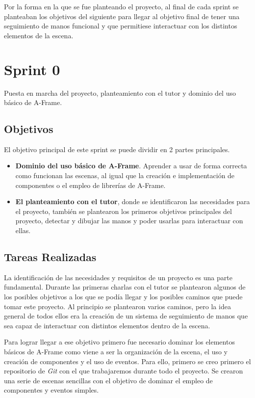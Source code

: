 \documentclass[a4paper, 12pt]{book}
\begin{document}
Por la forma en la que se fue planteando el proyecto, al final de cada sprint se planteaban los objetivos del siguiente para llegar al objetivo final de tener una seguimiento de manos funcional y que permitiese interactuar con los distintos elementos de la escena. \section{Sprint 0}
\label{sec:sprint0}
Puesta en marcha del proyecto, planteamiento con el tutor y dominio del uso básico de A-Frame.
\subsection{Objetivos}
\label{subsec:objetivo-principal0}
El objetivo principal de este sprint se puede dividir en 2 partes principales. 
\begin{itemize}
  \item \textbf{Dominio del uso básico de A-Frame}. Aprender a usar de forma correcta como funcionan las escenas, al igual que la creación e implementación de componentes o el empleo de librerías de A-Frame.
  \item \textbf{El planteamiento con el tutor}, donde se identificaron las necesidades para el proyecto, también se plantearon los primeros objetivos principales del proyecto, detectar y dibujar las manos y poder usarlas para interactuar con ellas. 
\end{itemize}

\subsection{Tareas Realizadas}
\label{subsec:implementacion0}
La identificación de las necesidades y requisitos de un proyecto es una parte fundamental. Durante las primeras charlas con el tutor se plantearon algunos de los posibles objetivos a los que se podía llegar y los posibles caminos que puede tomar este proyecto. 
Al principio se plantearon varios caminos, pero la idea general de todos ellos era la creación de un sistema de seguimiento de manos que sea capaz de interactuar con distintos elementos dentro de la escena. 

Para lograr llegar a ese objetivo primero fue necesario dominar los elementos básicos de A-Frame como viene a ser la organización de la escena, el uso y creación de componentes y el uso de eventos. 
Para ello, primero se creo primero el repositorio de \textit{Git}  con el que trabajaremos durante todo el proyecto. Se crearon una serie de escenas sencillas con el objetivo de dominar el empleo de componentes y eventos simples. 
\end{document}
